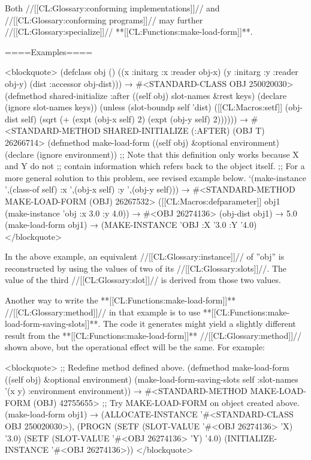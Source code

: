 Both //[[CL:Glossary:conforming implementations]]// and //[[CL:Glossary:conforming programs]]// may further //[[CL:Glossary:specialize]]// **[[CL:Functions:make-load-form]]**.

====Examples====

<blockquote> (defclass obj () ((x :initarg :x :reader obj-x) (y :initarg :y :reader obj-y) (dist :accessor obj-dist))) → #<STANDARD-CLASS OBJ 250020030> (defmethod shared-initialize :after ((self obj) slot-names &rest keys) (declare (ignore slot-names keys)) (unless (slot-boundp self 'dist) ([[CL:Macros:setf]] (obj-dist self) (sqrt (+ (expt (obj-x self) 2) (expt (obj-y self) 2)))))) → #<STANDARD-METHOD SHARED-INITIALIZE (:AFTER) (OBJ T) 26266714> (defmethod make-load-form ((self obj) &optional environment) (declare (ignore environment)) ;; Note that this definition only works because X and Y do not ;; contain information which refers back to the object itself. ;; For a more general solution to this problem, see revised example below. `(make-instance ',(class-of self) :x ',(obj-x self) :y ',(obj-y self))) → #<STANDARD-METHOD MAKE-LOAD-FORM (OBJ) 26267532> ([[CL:Macros:defparameter]] obj1 (make-instance 'obj :x 3.0 :y 4.0)) → #<OBJ 26274136> (obj-dist obj1) → 5.0 (make-load-form obj1) → (MAKE-INSTANCE 'OBJ :X '3.0 :Y '4.0) </blockquote>

In the above example, an equivalent //[[CL:Glossary:instance]]// of ''obj'' is reconstructed by using the values of two of its //[[CL:Glossary:slots]]//. The value of the third //[[CL:Glossary:slot]]// is derived from those two values.

\medbreak Another way to write the **[[CL:Functions:make-load-form]]** //[[CL:Glossary:method]]// in that example is to use **[[CL:Functions:make-load-form-saving-slots]]**. The code it generates might yield a slightly different result from the **[[CL:Functions:make-load-form]]** //[[CL:Glossary:method]]// shown above, but the operational effect will be the same. For example:

\smallbreak <blockquote> ;; Redefine method defined above. (defmethod make-load-form ((self obj) &optional environment) (make-load-form-saving-slots self :slot-names '(x y) :environment environment)) → #<STANDARD-METHOD MAKE-LOAD-FORM (OBJ) 42755655> ;; Try MAKE-LOAD-FORM on object created above. (make-load-form obj1) → (ALLOCATE-INSTANCE '#<STANDARD-CLASS OBJ 250020030>), (PROGN (SETF (SLOT-VALUE '#<OBJ 26274136> 'X) '3.0) (SETF (SLOT-VALUE '#<OBJ 26274136> 'Y) '4.0) (INITIALIZE-INSTANCE '#<OBJ 26274136>)) </blockquote>

